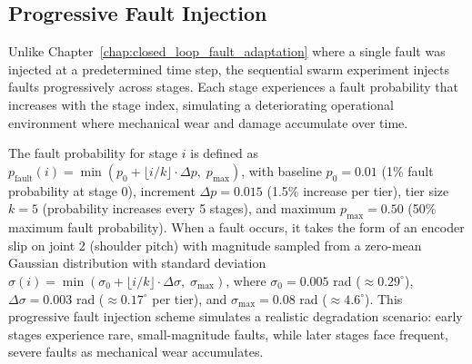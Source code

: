 \documentclass[12pt,a4paper,oneside]{report}
\begin{document}
\subsection{Progressive Fault Injection}
\label{subsec:progressive_fault_injection}

Unlike Chapter~\ref{chap:closed_loop_fault_adaptation} where a single fault was injected at a predetermined time step, the sequential swarm experiment injects faults progressively across stages. Each stage experiences a fault probability that increases with the stage index, simulating a deteriorating operational environment where mechanical wear and damage accumulate over time.

The fault probability for stage $i$ is defined as $p_{\text{fault}}(i) = \min(p_0 + \lfloor i/k \rfloor \cdot \Delta p,\; p_{\text{max}})$, with baseline $p_0 = 0.01$ (1\% fault probability at stage 0), increment $\Delta p = 0.015$ (1.5\% increase per tier), tier size $k = 5$ (probability increases every 5 stages), and maximum $p_{\text{max}} = 0.50$ (50\% maximum fault probability). When a fault occurs, it takes the form of an encoder slip on joint 2 (shoulder pitch) with magnitude sampled from a zero-mean Gaussian distribution with standard deviation $\sigma(i) = \min(\sigma_0 + \lfloor i/k \rfloor \cdot \Delta \sigma,\; \sigma_{\text{max}})$, where $\sigma_0 = 0.005$ rad ($\approx 0.29^\circ$), $\Delta \sigma = 0.003$ rad ($\approx 0.17^\circ$ per tier), and $\sigma_{\text{max}} = 0.08$ rad ($\approx 4.6^\circ$). This progressive fault injection scheme simulates a realistic degradation scenario: early stages experience rare, small-magnitude faults, while later stages face frequent, severe faults as mechanical wear accumulates.
\end{document}
